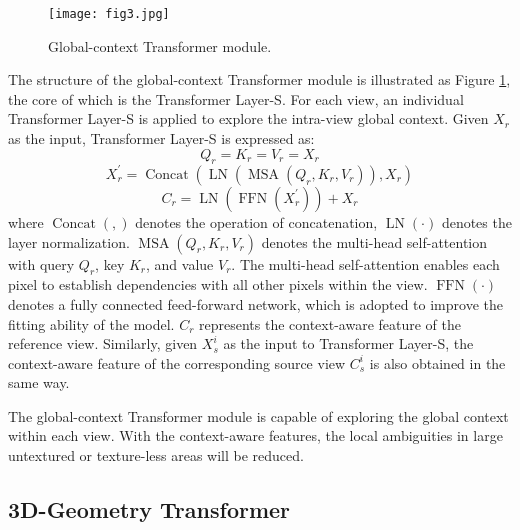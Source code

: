 \documentclass[10pt,twocolumn,letterpaper]{article}
\begin{document}
\begin{figure}[!t]
	\centering
	\texttt{[image: fig3.jpg]}
	\caption{Global-context Transformer module.}
	\label{fig.3}
\end{figure}

The structure of the global-context Transformer module is illustrated as Figure \ref{fig.3}, the core of which is the Transformer Layer-S. For each view, an individual Transformer Layer-S is applied to explore the intra-view global context. Given $X_{r}$ as the input, Transformer Layer-S is expressed as:
\begin{equation}
Q_{r}=K_{r}=V_{r}=X_{r}
\label{eq.3}
\end{equation}
\begin{equation}
X_{r}^{\prime}=\operatorname{Concat}\left(\operatorname{LN}\left(\operatorname{MSA}\left(Q_{r}, K_{r}, V_{r}\right)\right), X_{r}\right)
\label{eq.4}
\end{equation}
\begin{equation}
C_{r}=\operatorname{LN}\left(\operatorname{FFN}\left(X_{r}^{\prime}\right)\right)+X_{r}
\label{eq.5}
\end{equation}
where $\operatorname{Concat}(,)$ denotes the operation of concatenation, $\operatorname{LN}(\cdot)$ denotes the layer normalization. $\operatorname{MSA}\left(Q_{r}, K_{r}, V_{r}\right)$ denotes the multi-head self-attention with query $Q_{r}$, key $K_{r}$, and value $V_{r}$. The multi-head self-attention enables each pixel to establish dependencies with all other pixels within the view. $\operatorname{FFN}(\cdot)$ denotes a fully connected feed-forward network, which is adopted to improve the fitting ability of the model. $C_{r}$ represents the context-aware feature of the reference view. Similarly, given $X_{s}^{i}$ as the input to Transformer Layer-S, the context-aware feature of the corresponding source view $C_{s}^{i}$ is also obtained in the same way.

The global-context Transformer module is capable of exploring the global context within each view. With the context-aware features, the local ambiguities in large untextured or texture-less areas will be reduced.

\subsection{3D-Geometry Transformer}
\end{document}
